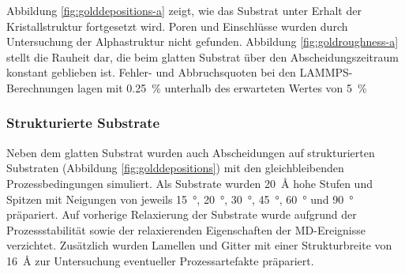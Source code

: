 Abbildung \ref{fig:golddepositions-a} zeigt, wie das Substrat unter Erhalt der Kristallstruktur fortgesetzt wird.
Poren und Einschlüsse wurden durch Untersuchung der Alphastruktur nicht gefunden.
Abbildung \ref{fig:goldroughness-a} stellt die Rauheit dar, die beim glatten Substrat über den Abscheidungszeitraum konstant geblieben ist.
Fehler- und Abbruchsquoten bei den LAMMPS-Berechnungen lagen mit \SI{0.25}{\percent} unterhalb des erwarteten Wertes von \SI{5}{\percent}

\subsubsection{Strukturierte Substrate}

Neben dem glatten Substrat wurden auch Abscheidungen auf strukturierten Substraten (Abbildung \ref{fig:golddepositions}) mit den gleichbleibenden Prozessbedingungen simuliert.
Als Substrate wurden \SI{20}{\angstrom} hohe Stufen und Spitzen mit Neigungen von jeweils \SI{15}{\degree}, \SI{20}{\degree}, \SI{30}{\degree}, \SI{45}{\degree}, \SI{60}{\degree} und \SI{90}{\degree} präpariert.
Auf vorherige Relaxierung der Substrate wurde aufgrund der Prozessstabilität sowie der relaxierenden Eigenschaften der MD-Ereignisse verzichtet.
Zusätzlich wurden Lamellen und Gitter mit einer Strukturbreite von \SI{16}{\angstrom} zur Untersuchung eventueller Prozessartefakte präpariert.

